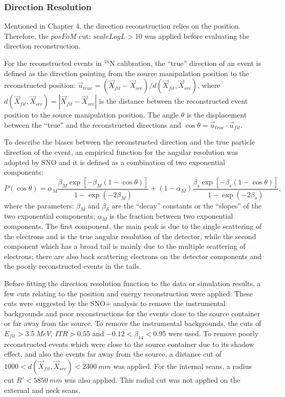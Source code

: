 \subsubsection{Direction Resolution}
Mentioned in Chapter 4, the direction reconstruction relies on the position. Therefore, the $posFoM$ cut: $scaleLogL>10$ was applied before evaluating the direction reconstruction. 

For the reconstructed events in $^{16}$N calibration, the ``true'' direction of an event is defined as the direction pointing from the source manipulation position to the reconstructed position: $\vec{u}_{true} = (\vec{X}_{fit}-\vec{X}_{src})/d(\vec{X}_{fit},\vec{X}_{src})$, where $d(\vec{X}_{fit},\vec{X}_{src})=|\vec{X}_{fit}-\vec{X}_{src}|$ is the distance between the reconstructed event position to the source manipulation position. The angle $\theta$ is the displacement between the ``true'' and the reconstructed directions and $\cos\theta=\vec{u}_{true}\cdot \vec{u}_{fit}$.

To describe the biases between the reconstructed direction and the true particle direction of the event, an empirical function for the angular resolution was adopted by SNO\cite{boulay2004direct} and it is defined as a combination of two exponential components:
\begin{equation}
P(\cos\theta)=\alpha_M\frac{\beta_M\exp[-\beta_M(1-\cos\theta)]}{1-\exp(-2\beta_M)}+(1-\alpha_M)\frac{\beta_s\exp[-\beta_s(1-\cos\theta)]}{1-\exp(-2\beta_s)},
\end{equation}
where the parameters: $\beta_M$ and $\beta_S$ are the ``decay'' constants or the ``slopes'' of the two exponential components; $\alpha_M$ is the fraction between two exponential components. The first component, the main peak is due to the single scattering of the electrons and is the true angular resolution of the detector, while the second component which has a broad tail is mainly due to the multiple scattering of electrons; there are also back scattering electrons on the detector components and the poorly reconstructed events in the tails\cite{boulay2004direct}.

Before fitting the direction resolution function to the data or simulation results, a few cuts relating to the position and energy reconstruction were applied. These cuts were suggested by the SNO+ analysis to remove the instrumental backgrounds and poor reconstructions for the events close to the source container or far away from the source. To remove the instrumental backgrounds, the cuts of $E_{fit}>3.5~MeV$, $ITR>0.55$ and $-0.12<\beta_{14}<0.95$ were used. To remove poorly reconstructed events which were close to the source container due to its shadow effect, and also the events far away from the source, a distance cut of $1000<d(\vec{X}_{fit},\vec{X}_{src})<2300~mm$ was applied. For the internal scans, a radius cut $R'<5850~mm$ was also applied. This radial cut was not applied on the external and neck scans\cite{waterunidoc}.

